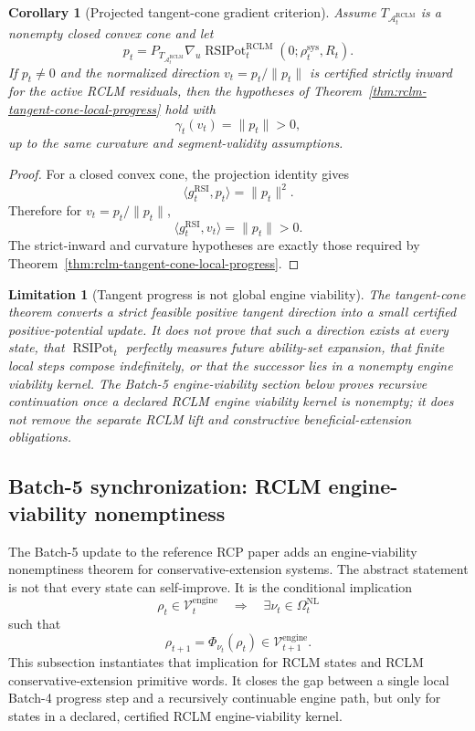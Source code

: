 \documentclass[11pt,a4paper]{article}
\newtheorem{corollary}[theorem]{Corollary}
\newtheorem{limitation}[theorem]{Limitation}
\newcommand{\Acal}{\mathcal A}
\newcommand{\Vcal}{\mathcal V}
\newcommand{\RCLM}{\mathrm{RCLM}}
\newcommand{\RSI}{\mathrm{RSI}}
\newcommand{\sys}{\mathrm{sys}}
\newcommand{\engine}{\mathrm{engine}}
\newcommand{\NL}{\mathrm{NL}}
\newcommand{\RSIPot}{\operatorname{RSIPot}}
\begin{document}
\begin{corollary}[Projected tangent-cone gradient criterion]
\label{cor:rclm-projected-gradient-criterion}
Assume \(T_{\Acal_t^{\RCLM}}\) is a nonempty closed convex cone and let
\[
p_t=P_{T_{\Acal_t^{\RCLM}}}\nabla_u\RSIPot_t^{\RCLM}(0;\rho_t^{\sys},R_t).
\]
If \(p_t\ne0\) and the normalized direction \(v_t=p_t/\|p_t\|\) is certified strictly inward for the active RCLM residuals, then the hypotheses of Theorem~\ref{thm:rclm-tangent-cone-local-progress} hold with
\[
\gamma_t(v_t)=\|p_t\|>0,
\]
up to the same curvature and segment-validity assumptions.
\end{corollary}

\begin{proof}
For a closed convex cone, the projection identity gives
\[
\langle g_t^{\RSI},p_t\rangle=\|p_t\|^2.
\]
Therefore for \(v_t=p_t/\|p_t\|\),
\[
\langle g_t^{\RSI},v_t\rangle=\|p_t\|>0.
\]
The strict-inward and curvature hypotheses are exactly those required by Theorem~\ref{thm:rclm-tangent-cone-local-progress}.
\end{proof}

\begin{limitation}[Tangent progress is not global engine viability]
The tangent-cone theorem converts a strict feasible positive tangent direction into a small certified positive-potential update.  It does not prove that such a direction exists at every state, that \(\RSIPot_t\) perfectly measures future ability-set expansion, that finite local steps compose indefinitely, or that the successor lies in a nonempty engine viability kernel.  The Batch-5 engine-viability section below proves recursive continuation once a declared RCLM engine viability kernel is nonempty; it does not remove the separate RCLM lift and constructive beneficial-extension obligations.
\end{limitation}


\subsection{Batch-5 synchronization: RCLM engine-viability nonemptiness}
\label{subsec:batch5-rclm-engine-viability}

The Batch-5 update to the reference RCP paper adds an engine-viability nonemptiness theorem for conservative-extension systems.  The abstract statement is not that every state can self-improve.  It is the conditional implication
\[
\rho_t\in\Vcal_t^{\engine}
\quad\Longrightarrow\quad
\exists\nu_t\in\Omega_t^{\NL}
\]
such that
\[
\rho_{t+1}=\Phi_{\nu_t}(\rho_t)\in\Vcal_{t+1}^{\engine}.
\]
This subsection instantiates that implication for RCLM states and RCLM conservative-extension primitive words.  It closes the gap between a single local Batch-4 progress step and a recursively continuable engine path, but only for states in a declared, certified RCLM engine-viability kernel.
\end{document}

